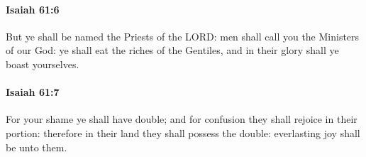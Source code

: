 		\paragraph{Isaiah 61:6} %
			\label{ISAIAH-61-6}

			But ye shall be named the Priests of the LORD: men shall call you the Ministers of our God: ye shall eat the riches of the Gentiles, and in their glory shall ye boast yourselves.


		\paragraph{Isaiah 61:7} %
			\label{ISAIAH-61-7}

			For your shame ye shall have double; and for confusion they shall rejoice in their portion: therefore in their land they shall possess the double: everlasting joy shall be unto them.


